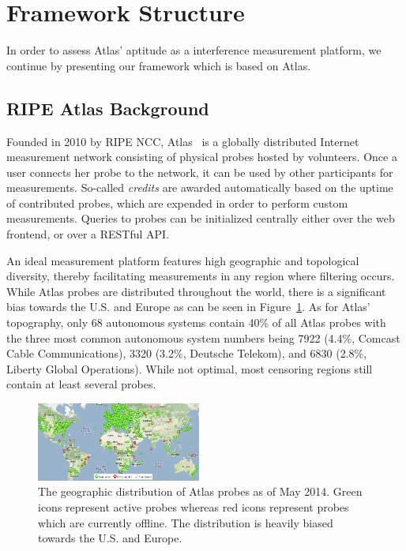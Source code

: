 \section{Framework Structure}
\label{sec:framework}
In order to assess Atlas' aptitude as a interference measurement platform, we
continue by presenting our framework which is based on Atlas.

\subsection{RIPE Atlas Background}
Founded in 2010 by RIPE NCC, Atlas~\cite{atlas} is a globally
distributed Internet measurement network consisting of physical probes hosted
by volunteers.  Once a user connects her probe to the network, it can be used
by other participants for measurements. So-called \emph{credits} are awarded
automatically based on the uptime of contributed probes, which are expended in
order to perform custom measurements. Queries to probes can be initialized
centrally either over the web frontend, or over a RESTful API.

An ideal measurement platform features high geographic and
topological diversity, thereby facilitating measurements in any region where
filtering occurs.  While Atlas probes are distributed throughout the world,
there is a significant bias towards the U.S. and Europe as can be seen in
Figure~\ref{fig:probe_distribution}.  As for Atlas' topography, only 68
autonomous systems contain 40\% of all Atlas probes with the three most common
autonomous system numbers being 7922 (4.4\%, Comcast Cable Communications),
3320 (3.2\%, Deutsche Telekom), and 6830 (2.8\%, Liberty Global Operations).
While not optimal, most censoring regions still contain at least several
probes.

\begin{figure}[t]
\centering
\includegraphics[width=0.48\textwidth]{diagrams/probe_distribution.jpg}
\caption{The geographic distribution of Atlas probes as of May 2014.  Green
icons represent active probes whereas red icons represent probes which are
currently offline.  The distribution is heavily biased towards the U.S. and
Europe.} \label{fig:probe_distribution}
\end{figure}

